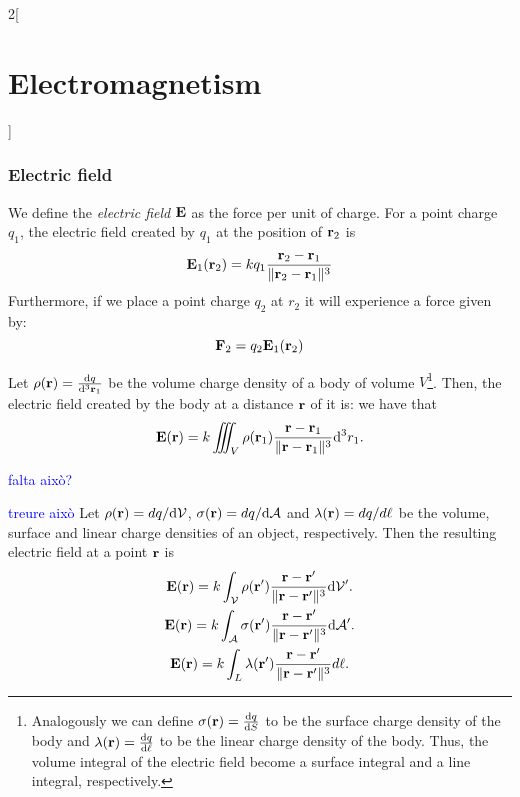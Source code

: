 \documentclass[../../../main.tex]{subfiles}
\begin{document}
\begin{multicols}{2}[\section{Electromagnetism}]
  \subsubsection{Electric field}
  \begin{prop}
    We define the \emph{electric field} $\boldsymbol{\mathrm{E}}$ as the force per unit of charge. For a point charge $q_1$, the electric field created by $q_1$ at the position of $\boldsymbol{\mathrm{r}}_2$ is $$\boldsymbol{\mathrm{E}}_1(\boldsymbol{\mathrm{r}}_2)=kq_1\frac{\boldsymbol{\mathrm{r}}_2-\boldsymbol{\mathrm{r}}_1}{\|\boldsymbol{\mathrm{r}}_2-\boldsymbol{\mathrm{r}}_1\|^3}$$ Furthermore, if we place a point charge $q_2$ at $r_2$ it will experience a force given by: $$\boldsymbol{\mathrm{F}}_2=q_2\boldsymbol{\mathrm{E}}_1(\boldsymbol{\mathrm{r}}_2)$$
  \end{prop}
  \begin{prop}
    Let $\rho(\boldsymbol{\mathrm{r}})=\dv{q}{^3\boldsymbol{\mathrm{r}}_1}$ be the volume charge density of a body of volume $V$\footnote{Analogously we can define $\sigma(\boldsymbol{\mathrm{r}})=\dv{q}{S}$ to be the surface charge density of the body and $\lambda(\boldsymbol{\mathrm{r}})=\dv{q}{\ell}$ to be the linear charge density of the body. Thus, the volume integral of the electric field become a surface integral and a line integral, respectively.}. Then, the electric field created by the body at a distance $\boldsymbol{\mathrm{r}}$ of it is: we have that $$\boldsymbol{\mathrm{E}}(\boldsymbol{\mathrm{r}})=k\iiint_V\rho(\boldsymbol{\mathrm{r}}_1)\frac{\boldsymbol{\mathrm{r}}-\boldsymbol{\mathrm{r}}_1}{\|\boldsymbol{\mathrm{r}}-\boldsymbol{\mathrm{r}}_1\|^3}\dd^3r_1.$$
  \end{prop}
  \begin{theorem}
    \textcolor{blue}{falta això?}
    $$$$
  \end{theorem}
  \begin{prop}\textcolor{blue}{treure això}
    Let $\rho(\boldsymbol{\mathrm{r}})=dq/\dd \mathcal{V}$, $\sigma(\boldsymbol{\mathrm{r}})=dq/\dd \mathcal{A}$ and $\lambda(\boldsymbol{\mathrm{r}})=dq/d\ell$ be the volume, surface and linear charge densities of an object, respectively. Then the resulting electric field at a point $\boldsymbol{\mathrm{r}}$ is
    \begin{gather*}
      \boldsymbol{\mathrm{E}}(\boldsymbol{\mathrm{r}})=k\int_\mathcal{V}\rho(\boldsymbol{\mathrm{r}}')\frac{\boldsymbol{\mathrm{r}}-\boldsymbol{\mathrm{r}}'}{\|\boldsymbol{\mathrm{r}}-\boldsymbol{\mathrm{r}}'\|^3}\dd \mathcal{V}'.\\
      \boldsymbol{\mathrm{E}}(\boldsymbol{\mathrm{r}})=k\int_\mathcal{A}\sigma(\boldsymbol{\mathrm{r}}')\frac{\boldsymbol{\mathrm{r}}-\boldsymbol{\mathrm{r}}'}{\|\boldsymbol{\mathrm{r}}-\boldsymbol{\mathrm{r}}'\|^3}\dd \mathcal{A}'.\\
      \boldsymbol{\mathrm{E}}(\boldsymbol{\mathrm{r}})=k\int_L\lambda(\boldsymbol{\mathrm{r}}')\frac{\boldsymbol{\mathrm{r}}-\boldsymbol{\mathrm{r}}'}{\|\boldsymbol{\mathrm{r}}-\boldsymbol{\mathrm{r}}'\|^3}d\ell.
    \end{gather*}
  \end{prop}
  \begin{theorem}

\end{theorem}
\end{multicols}
\end{document}
